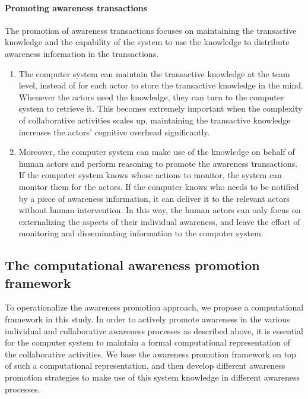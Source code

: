 \paragraph*{Promoting awareness transactions} %
\label{par:promoting_awareness_transactions}
The promotion of awareness transactions focuses on maintaining the transactive knowledge and the capability of the system to use the knowledge to distribute awareness information in the transactions. 
\begin{enumerate}
   \item The computer system can maintain the transactive knowledge at the team level, instead of for each actor to store the transactive knowledge in the mind. Whenever the actors need the knowledge, they can turn to the computer system to retrieve it. This becomes extremely important when the complexity of collaborative activities scales up, maintaining the transactive knowledge increases the actors' cognitive overhead significantly.
   \item Moreover, the computer system can make use of the knowledge on behalf of human actors and perform reasoning to promote the awareness transactions. If the computer system knows whose actions to monitor, the system can monitor them for the actors. If the computer knows who needs to be notified by a piece of awareness information, it can deliver it to the relevant actors without human intervention. In this way, the human actors can only focus on externalizing the aspects of their individual awareness, and leave the effort of monitoring and disseminating information to the computer system.
\end{enumerate}

\subsection{The computational awareness promotion framework} %
\label{sub:the_awareness_promotion_framework}
To operationalize the awareness promotion approach, we propose a computational framework in this study. In order to actively promote awareness in the various individual and collaborative awareness processes as described above, it is essential for the computer system to maintain a formal computational representation of the collaborative activities. We base the awareness promotion framework on top of such a computational representation, and then develop different awareness promotion strategies to make use of this system knowledge in different awareness processes. 

